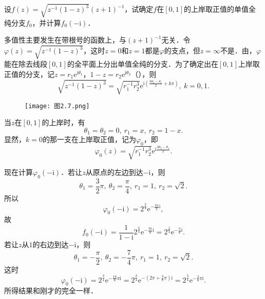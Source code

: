 \documentclass[../../main.tex]{subfiles}
\begin{document}
\begin{example}
设$f(z) = \sqrt{z^{-1}(1 - z)^3} (z + 1)^{-1}$，试确定$f$在$[0,1]$的上岸取正值的单值全纯分支$f_0$，并计算$f_0(-\text{i})$．
\end{example}
\begin{solution}
多值性主要发生在带根号的函数上，与$(z + 1)^{-1}$无关．令$\varphi(z) = \sqrt{z^{-1}(1 - z)^3}$，这时$z = 0$和$z = 1$都是$\varphi$的支点，但$z = \infty$不是．由，$\varphi$能在除去线段$[0,1]$的全平面上分出单值全纯的分支．为了确定出在$[0,1]$上岸取正值的分支，记$z = r_1 \text{e}^{\text{i}\theta_1}$，$1 - z = r_2 \text{e}^{\text{i}\theta_2}$（），则
\[
\sqrt{z^{-1}(1 - z)^3} = \sqrt{r_1^{-1} r_2^3} \text{e}^{\text{i}\left( \frac{3\theta_2 - \theta_1}{2} + k\pi \right)}, \ k = 0,1.
\]

\begin{figure}[H]
\centering
\texttt{[image: 图2.7.png]}
\caption{}
\label{figure:图2.7}
\end{figure}

当$z$在$[0,1]$的上岸时，有
\[
\theta_1 = \theta_2 = 0, \ r_1 = x, \ r_2 = 1 - x.
\]
显然，$k = 0$的那一支在上岸取正值，记为$\varphi_0$，即
\[
\varphi_0(z) = \sqrt{r_1^{-1} r_2^3} \text{e}^{\text{i}\frac{3\theta_2 - \theta_1}{2}}.
\]

现在计算$\varphi_0(-\text{i})$．若让$z$从原点的左边到达$-\text{i}$，则
\[
\theta_1 = \dfrac{3}{2}\pi, \ \theta_2 = \dfrac{\pi}{4}, \ r_1 = 1, \ r_2 = \sqrt{2}.
\]
所以
\[
\varphi_0(-\text{i}) = 2^{\frac{3}{4}} \text{e}^{-\frac{3\pi}{8} \text{i}},
\]
故
\[
f_0(-\text{i}) = \dfrac{1}{1 - \text{i}} 2^{\frac{3}{4}} \text{e}^{-\frac{3\pi}{8} \text{i}}
= 2^{\frac{1}{4}} \text{e}^{-\frac{\pi}{8} \text{i}}.
\]
若让$z$从$1$的右边到达$-\text{i}$，则
\[
\theta_1 = -\dfrac{\pi}{2}, \ \theta_2 = -\dfrac{7}{4}\pi, \ r_1 = 1, \ r_2 = \sqrt{2}.
\]
这时
\[
\varphi_0(-\text{i}) = 2^{\frac{3}{4}} \text{e}^{-\frac{19}{8}\pi \text{i}}
= 2^{\frac{3}{4}} \text{e}^{-\left( 2\pi + \frac{3}{8}\pi \right) \text{i}}
= 2^{\frac{3}{4}} \text{e}^{-\frac{3}{8}\pi \text{i}}.
\]
所得结果和刚才的完全一样．
\end{solution}
\end{document}
